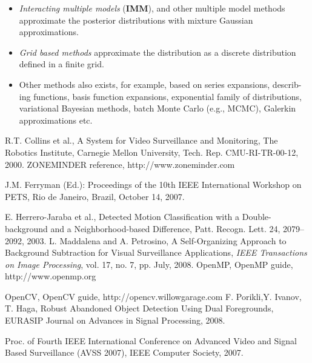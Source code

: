 \documentclass[10pt]{llncs}
\begin{document}
\begin{itemize}
\item \textit{Interacting multiple models} (\textbf{IMM}), and other multiple model methods approximate the posterior distributions with mixture Gaussian approximations.
\item \textit{Grid based methods} approximate the distribution as a discrete distribution
defined in a finite grid.
\item Other methods also exists, for example, based on series expansions, describ-
ing functions, basis function expansions, exponential family of distributions,
variational Bayesian methods, batch Monte Carlo (e.g., MCMC), Galerkin
approximations etc.
\end{itemize}




\newpage











%
  

\begin{thebibliography}{99}

R.T. Collins et al., A System for Video Surveillance and
Monitoring, The Robotics Institute, Carnegie Mellon University,
Tech. Rep. CMU-RI-TR-00-12, 2000.
%
ZONEMINDER reference, http://www.zoneminder.com

%
J.M. Ferryman (Ed.): Proceedings of the 10th IEEE International
Workshop on PETS, Rio de Janeiro, Brazil, October 14, 2007.

E. Herrero-Jaraba et al., Detected Motion Classification with a
Double-background and a Neighborhood-based Difference,
Patt. Recogn. Lett. 24, 2079--2092, 2003.
%
L. Maddalena and A. Petrosino, A Self-Organizing Approach to
Background Subtraction for Visual Surveillance Applications, {\sl
IEEE Transactions on Image Processing}, vol. 17, no. 7, pp. July,
2008.
%
OpenMP, OpenMP guide, http://www.openmp.org

OpenCV, OpenCV guide, http://opencv.willowgarage.com
%
F. Porikli,Y. Ivanov, T. Haga,
Robust Abandoned Object Detection Using Dual Foregrounds,
EURASIP Journal on Advances in Signal Processing, 2008.

Proc. of Fourth IEEE International Conference on Advanced Video
and Signal Based Surveillance (AVSS 2007), IEEE Computer Society,
2007.

\end{thebibliography}
\end{document}
